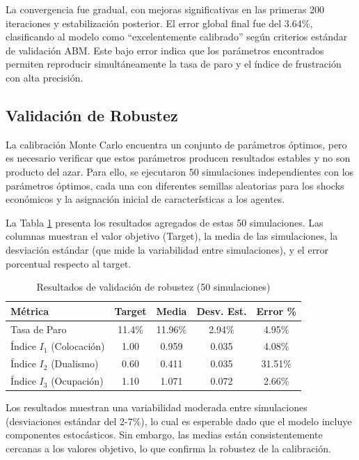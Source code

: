 La convergencia fue gradual, con mejoras significativas en las primeras 200 iteraciones y estabilización posterior. El error global final fue del 3.64\%, clasificando al modelo como ``excelentemente calibrado'' según criterios estándar de validación ABM. Este bajo error indica que los parámetros encontrados permiten reproducir simultáneamente la tasa de paro y el índice de frustración con alta precisión.

\subsection{Validación de Robustez}

La calibración Monte Carlo encuentra un conjunto de parámetros óptimos, pero es necesario verificar que estos parámetros producen resultados estables y no son producto del azar. Para ello, se ejecutaron 50 simulaciones independientes con los parámetros óptimos, cada una con diferentes semillas aleatorias para los shocks económicos y la asignación inicial de características a los agentes.

La Tabla \ref{tab:robustez} presenta los resultados agregados de estas 50 simulaciones. Las columnas muestran el valor objetivo (Target), la media de las simulaciones, la desviación estándar (que mide la variabilidad entre simulaciones), y el error porcentual respecto al target.

\begin{table}[h]
\centering
\caption{Resultados de validación de robustez (50 simulaciones)}
\label{tab:robustez}
\begin{tabular}{lcccc}
\toprule
\textbf{Métrica} & \textbf{Target} & \textbf{Media} & \textbf{Desv. Est.} & \textbf{Error \%} \\
\midrule
Tasa de Paro & 11.4\% & 11.96\% & 2.94\% & 4.95\% \\
Índice $I_1$ (Colocación) & 1.00 & 0.959 & 0.035 & 4.08\% \\
Índice $I_2$ (Dualismo) & 0.60 & 0.411 & 0.035 & 31.51\% \\
Índice $I_3$ (Ocupación) & 1.10 & 1.071 & 0.072 & 2.66\% \\
\bottomrule
\end{tabular}
\end{table}

Los resultados muestran una variabilidad moderada entre simulaciones (desviaciones estándar del 2-7\%), lo cual es esperable dado que el modelo incluye componentes estocásticos. Sin embargo, las medias están consistentemente cercanas a los valores objetivo, lo que confirma la robustez de la calibración.

